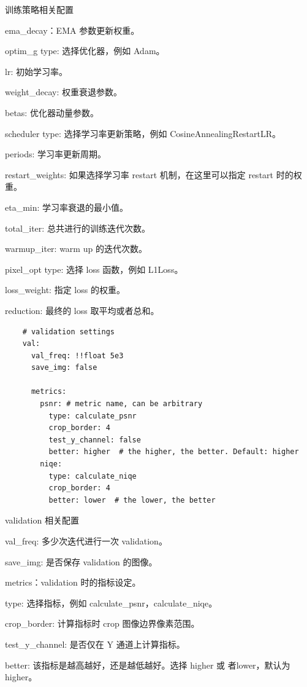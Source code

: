 \documentclass[../main.tex]{subfiles}
\begin{document}
    \begin{exampleBox}[righthand ratio=0.00, sidebyside, sidebyside align=center, lower separated=false]{训练策略相关配置}

    ema\_decay：EMA 参数更新权重。

    optim\_g type: 选择优化器，例如 Adam。

    lr: 初始学习率。

    weight\_decay: 权重衰退参数。

    betas: 优化器动量参数。

    scheduler type: 选择学习率更新策略，例如 CosineAnnealingRestartLR。

    periods: 学习率更新周期。

    restart\_weights: 如果选择学习率 restart 机制，在这里可以指定 restart 时的权重。

    eta\_min: 学习率衰退的最小值。

    total\_iter: 总共进行的训练迭代次数。

    warmup\_iter: warm up 的迭代次数。

    pixel\_opt type: 选择 loss 函数，例如 L1Loss。

    loss\_weight: 指定 loss 的权重。

    reduction: 最终的 loss 取平均或者总和。

    \end{exampleBox}
    \begin{verbatim}
    # validation settings
    val:
      val_freq: !!float 5e3
      save_img: false

      metrics:
        psnr: # metric name, can be arbitrary
          type: calculate_psnr
          crop_border: 4
          test_y_channel: false
          better: higher  # the higher, the better. Default: higher
        niqe:
          type: calculate_niqe
          crop_border: 4
          better: lower  # the lower, the better
    \end{verbatim}
    \begin{exampleBox}[righthand ratio=0.00, sidebyside, sidebyside align=center, lower separated=false]{validation 相关配置}

    val\_freq: 多少次迭代进行一次 validation。

    save\_img: 是否保存 validation 的图像。

    metrics：validation 时的指标设定。

    type: 选择指标，例如 calculate\_psnr，calculate\_niqe。

    crop\_border: 计算指标时 crop 图像边界像素范围。

    test\_y\_channel: 是否仅在 Y 通道上计算指标。

    better: 该指标是越高越好，还是越低越好。选择 higher 或 者lower，默认为 higher。
    \end{exampleBox}
\end{document}
